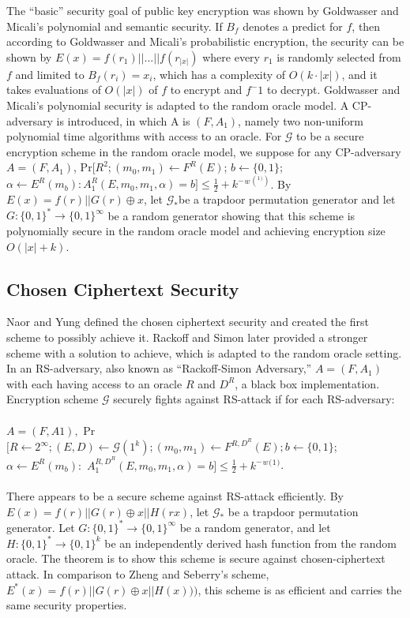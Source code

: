 \documentclass{article}
\begin{document}
The “basic” security goal of public key encryption was shown by Goldwasser and Micali's polynomial and semantic security. \cite{10.1016/0022-0000(84)90070-9} If $B_f$ denotes a predict for $f$, then according to Goldwasser and Micali’s probabilistic encryption, the security can be shown by $E(x) = f(r_1)||...||f(r_|x|)$ where every $r_1$ is randomly selected from $f$ and limited to $B_f(r_i) = x_i$, which has a complexity of $O(k\cdot|x|)$, and it takes evaluations of $O(|x|)$ of $f$ to encrypt and $f^-1$ to decrypt. Goldwasser and Micali's polynomial security is adapted to the random oracle model. A CP-adversary is introduced, in which A is $(F, A_1)$, namely two non-uniform polynomial time algorithms with access to an oracle. For $\mathcal{G}$ to be a secure encryption scheme in the random oracle model, we suppose for any CP-adversary $A=(F,A_1)$, Pr[$R^2; (m_0,m_1) \gets F^R(E)$; $b \gets \lbrace0,1\rbrace$; $\alpha \gets E^R(m_b): A_1^R(E,m_0,m_1,\alpha)=b]\leq\frac{1}{2}+k^-{}^w{}^({}^1{}^))$. By $E(x)=f(r)||G(r)\oplus x$, let $\mathcal{G}_*$be a trapdoor permutation generator and let $G:\lbrace0,1\rbrace^* \to \lbrace0,1\rbrace^\infty$ be a random generator showing that this scheme is polynomially secure in the random oracle model and achieving encryption size $O(|x|+k)$.

\subsection{Chosen Ciphertext Security}

Naor and Yung defined the chosen ciphertext security \cite{10.1145/100216.100273} and created the first scheme to possibly achieve it. \cite{10.1007/3-540-46766-1_35} Rackoff and Simon later provided a stronger scheme with a solution to achieve, which is adapted to the random oracle setting. In an RS-adversary, also  known as “Rackoff-Simon Adversary,” $A=(F,A_1)$ with each having access to an oracle $R$ and $D^R$, a black box implementation. Encryption scheme $\mathcal{G}$ securely fights against RS-attack if for each RS-adversary:
\\
\\
\noindent
$A=(F,A1),$ Pr$[R \gets 2^\infty; (E,D)\gets \mathcal{G}(1^k);(m_0,m_1) \gets F^{R, D^{R}}(E); b \gets \lbrace0,1\rbrace$; $\alpha \gets E^R(m_b):$ $A_1^{R, D^{R}}(E,m_0,m_1,\alpha)=b]\leq\frac{1}{2}+k^-{}^w{}^({}^1{}^)$.
\\
\\
\noindent
There appears to be a secure scheme against RS-attack efficiently. By $E(x) = f(r)||G(r) \oplus x||H(rx)$, let $\mathcal{G}_*$ be a trapdoor permutation generator. Let $G:\lbrace0,1\rbrace^* \to \lbrace0,1\rbrace^\infty$ be a random generator, and let $H: \lbrace0,1\rbrace^* \to \lbrace0,1\rbrace^k$ be an independently derived hash function from the random oracle. The theorem is to show this scheme is secure against chosen-ciphertext attack. In comparison to Zheng and Seberry’s scheme, $E^*(x) = f(r)||G(r) \oplus x||H(x)))$, this scheme is as efficient and carries the same security properties.
\end{document}
